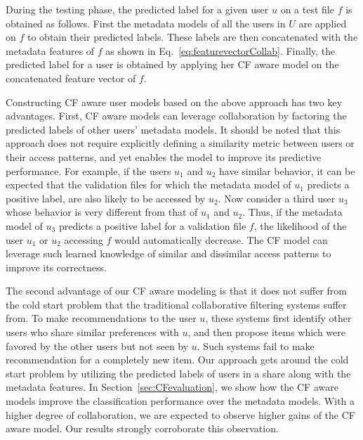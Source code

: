 During the testing phase, the predicted label for a given user $u$ on
a test file $f$ is obtained as follows. First the metadata models of
all the users in $U$ are applied on $f$ to obtain their predicted labels.
These labels are then concatenated with the metadata features of $f$ as shown in Eq.~\ref{eq:featurevectorCollab}.  Finally, the
predicted label for a user is obtained by applying her CF aware model on
the concatenated feature vector of $f$.


Constructing CF aware user models based on the above approach has two
key advantages. First, CF aware models can leverage collaboration by
factoring the predicted labels of other users' metadata models. It
should be noted that this approach does not require explicitly
defining a similarity metric between users or their access patterns,
and yet enables the model to improve its predictive performance.  For
example, if the users $u_1$ and $u_2$ have similar behavior, it can be
expected that the validation files for which the metadata model of
$u_1$ predicts a positive label, are also likely to be accessed by
$u_2$.  Now consider a third user $u_3$ whose behavior is very
different from that of $u_1$ and $u_2$.  Thus, if the metadata model
of $u_3$ predicts a positive label for a validation file $f$, the
likelihood of the user $u_1$ or $u_2$ accessing $f$ would
automatically decrease. The CF model can leverage such learned
knowledge of similar and dissimilar access patterns to improve its
correctness.

The second advantage of our CF aware modeling is that it does not
suffer from the cold start problem that the traditional collaborative
filtering systems suffer from. To make recommendations to the user
$u$, these systems first identify other users who share similar
preferences with $u$, and then propose items which were favored by the
other users but not seen by $u$.  Such systems fail to make
recommendation for a completely new item.  Our approach gets around
the cold start problem by utilizing the predicted labels of users in a
share along with the metadata features.  In
Section~{\ref{sec:CFevaluation}}, we show how the CF aware models
improve the classification performance over the metadata models.  With
a higher degree of collaboration, we are expected to observe higher
gains of the CF aware model. Our results strongly corroborate this
observation.
